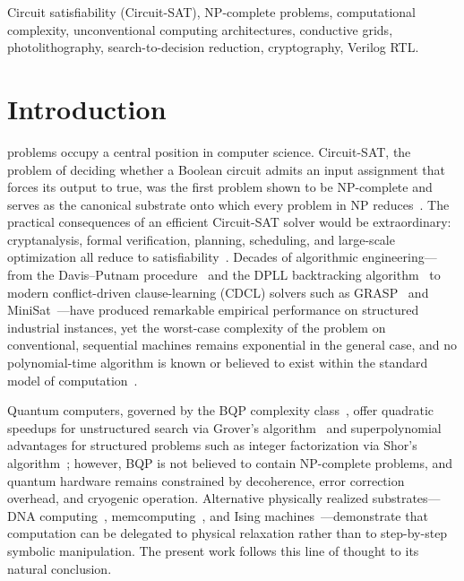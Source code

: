 \documentclass[letterpaper,journal]{IEEEtran}
\begin{document}
\begin{IEEEkeywords}
Circuit satisfiability (Circuit-SAT), NP-complete problems, computational
complexity, unconventional computing architectures, conductive grids,
photolithography, search-to-decision reduction, cryptography, Verilog RTL.
\end{IEEEkeywords}

\section{Introduction}
 problems occupy a central position in
computer science. Circuit-SAT, the problem of deciding whether a Boolean
circuit admits an input assignment that forces its output to true, was the
first problem shown to be NP-complete and serves as the canonical substrate
onto which every problem in NP reduces~\cite{cook1971,levin1973}. The
practical consequences of an efficient Circuit-SAT solver would be
extraordinary: cryptanalysis, formal verification, planning, scheduling, and
large-scale optimization all reduce to
satisfiability~\cite{garey1979,karp1972,tseitin1968,biere2009}. Decades of
algorithmic engineering---from the Davis--Putnam
procedure~\cite{davis1960} and the DPLL backtracking
algorithm~\cite{davis1962} to modern conflict-driven clause-learning (CDCL)
solvers such as GRASP~\cite{marques1999} and MiniSat~\cite{een2003}---have
produced remarkable empirical performance on structured industrial
instances, yet the worst-case complexity of the problem on conventional,
sequential machines remains exponential in the general case, and no
polynomial-time algorithm is known or believed to exist within the standard
model of computation~\cite{arora2009}.

Quantum computers, governed by the BQP complexity
class~\cite{bernstein1997,nielsen2000}, offer quadratic speedups for
unstructured search via Grover's algorithm~\cite{grover1996} and
superpolynomial advantages for structured problems such as integer
factorization via Shor's algorithm~\cite{shor1994}; however, BQP is not
believed to contain NP-complete problems, and quantum hardware remains
constrained by decoherence, error correction overhead, and cryogenic
operation. Alternative physically realized substrates---DNA
computing~\cite{adleman1994}, memcomputing~\cite{traversa2015,diventra2018},
and Ising machines~\cite{johnson2011,mohseni2022}---demonstrate that
computation can be delegated to physical relaxation rather than to
step-by-step symbolic manipulation. The present work follows this line of
thought to its natural conclusion.
\end{document}
